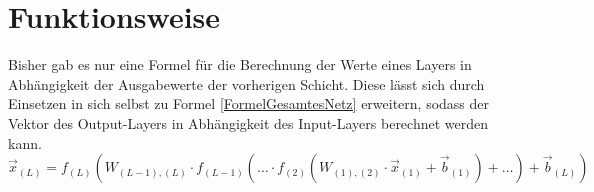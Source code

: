 \documentclass[
	a4paper,
	12pt,
	ngerman,
	oneside
]{scrreprt}											%
\begin{document}
	
			
		\section{Funktionsweise}
			Bisher gab es nur eine Formel für die Berechnung der Werte eines Layers in Abhängigkeit der Ausgabewerte der vorherigen Schicht. Diese lässt sich durch Einsetzen in sich selbst zu Formel \ref{FormelGesamtesNetz} erweitern, sodass der Vektor des Output-Layers in Abhängigkeit des Input-Layers berechnet werden kann. 
			\begin{equation}\label{FormelGesamtesNetz}
				\vec{x}_{(L)} = f_{(L)} \left( W_{(L-1),(L)} \cdot f_{(L-1)} \left(…\cdot f_{(2)} \left(W_{(1),(2)}\cdot\vec{x}_{(1)}+\vec{b}_{(1)}\right)+…\right)+\vec{b}_{(L)}\right)
			\end{equation}
			
\end{document}
